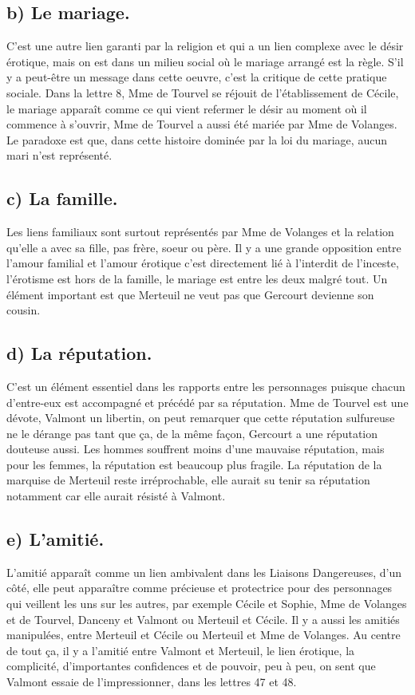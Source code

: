 \documentclass[12pt]{article}
\begin{document}
\subsection*{b) Le mariage.}
C'est une autre lien garanti par la religion et qui a un lien complexe avec le désir érotique, mais on est dans un milieu social où le mariage arrangé est la règle.
S'il y a peut-être un message dans cette oeuvre, c'est la critique de cette pratique sociale.
Dans la lettre 8, Mme de Tourvel se réjouit de l'établissement de Cécile, le mariage apparaît comme ce qui vient refermer le désir au moment où il commence à s'ouvrir, Mme de Tourvel a aussi été mariée par Mme de Volanges.
Le paradoxe est que, dans cette histoire dominée par la loi du mariage, aucun mari n'est représenté.
\subsection*{c) La famille.}
Les liens familiaux sont surtout représentés par Mme de Volanges et la relation qu'elle a avec sa fille, pas frère, soeur ou père.
Il y a une grande opposition entre l'amour familial et l'amour érotique c'est directement lié à l'interdit de l'inceste, l'érotisme est hors de la famille, le mariage est entre les deux malgré tout.
Un élément important est que Merteuil ne veut pas que Gercourt devienne son cousin.
\subsection*{d) La réputation.}
C'est un élément essentiel dans les rapports entre les personnages puisque chacun d'entre-eux est accompagné et précédé par sa réputation. Mme de Tourvel est une dévote, Valmont un libertin, on peut remarquer que cette réputation sulfureuse ne le dérange pas tant que ça, de la même façon, Gercourt a une réputation douteuse aussi.
Les hommes souffrent moins d'une mauvaise réputation, mais pour les femmes, la réputation est beaucoup plus fragile.
La réputation de la marquise de Merteuil reste irréprochable, elle aurait su tenir sa réputation notamment car elle aurait résisté à Valmont.
\subsection*{e) L'amitié.}
L'amitié apparaît comme un lien ambivalent dans les Liaisons Dangereuses, d'un côté, elle peut apparaître comme précieuse et protectrice pour des personnages qui veillent les uns sur les autres, par exemple Cécile et Sophie, Mme de Volanges et de Tourvel, Danceny et Valmont ou Merteuil et Cécile.
Il y a aussi les amitiés manipulées, entre Merteuil et Cécile ou Merteuil et Mme de Volanges.
Au centre de tout ça, il y a l'amitié entre Valmont et Merteuil, le lien érotique, la complicité, d'importantes confidences et de pouvoir, peu à peu, on sent que Valmont essaie de l'impressionner, dans les lettres 47 et 48.
\end{document}
